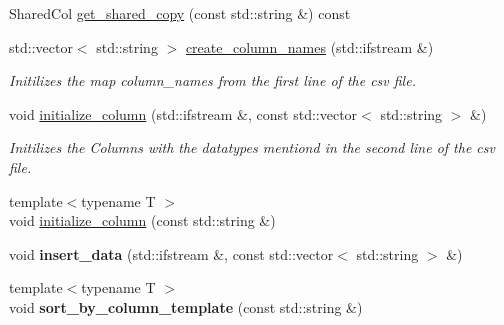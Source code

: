 \begin{DoxyCompactItemize}
\item 
Shared\+Col \hyperlink{classDataFrame_a97842254d757876650ea5bada057855e}{get\+\_\+shared\+\_\+copy} (const std\+::string \&) const
\item 
\mbox{\label{classDataFrame_ad65521a6929933f95823efa3e5a095e9}} 
std\+::vector$<$ std\+::string $>$ \hyperlink{classDataFrame_ad65521a6929933f95823efa3e5a095e9}{create\+\_\+column\+\_\+names} (std\+::ifstream \&)
\begin{DoxyCompactList}\small\item\em Initilizes the map {\ttfamily column\+\_\+names} from the first line of the csv file. \end{DoxyCompactList}\item 
\mbox{\label{classDataFrame_a207e76c73a757f4a2ba9013de8beaec5}} 
void \hyperlink{classDataFrame_a207e76c73a757f4a2ba9013de8beaec5}{initialize\+\_\+column} (std\+::ifstream \&, const std\+::vector$<$ std\+::string $>$ \&)
\begin{DoxyCompactList}\small\item\em Initilizes the Columns with the datatypes mentiond in the second line of the csv file. \end{DoxyCompactList}\item 
{\footnotesize template$<$typename T $>$ }\\void \hyperlink{classDataFrame_a133bc6ff5a8d26e77deb65ec005f32a7}{initialize\+\_\+column} (const std\+::string \&)
\item 
\mbox{\label{classDataFrame_a49d3f1a316e52031660658e9cfd8a78f}} 
void {\bfseries insert\+\_\+data} (std\+::ifstream \&, const std\+::vector$<$ std\+::string $>$ \&)
\item 
\mbox{\label{classDataFrame_af541608659c0b46139244a62a23d1c18}} 
{\footnotesize template$<$typename T $>$ }\\void {\bfseries sort\+\_\+by\+\_\+column\+\_\+template} (const std\+::string \&)
\end{DoxyCompactItemize}
